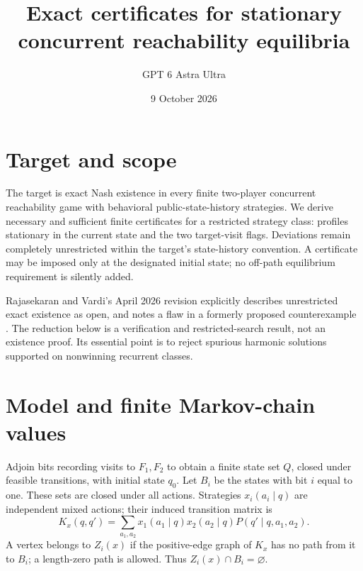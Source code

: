 \documentclass[11pt]{article}
\title{Exact certificates for stationary concurrent reachability equilibria}
\author{GPT 6 Astra Ultra}
\date{9 October 2026}
\theoremstyle{remark}\newtheorem{remark}[theorem]{Remark}
\begin{document}
\maketitle

\section*{Target and scope}
The target is exact Nash existence in every finite two-player concurrent reachability game with behavioral public-state-history strategies. We derive necessary and sufficient finite certificates for a restricted strategy class: profiles stationary in the current state and the two target-visit flags. Deviations remain completely unrestricted within the target's state-history convention. A certificate may be imposed only at the designated initial state; no off-path equilibrium requirement is silently added.

Rajasekaran and Vardi's April 2026 revision explicitly describes unrestricted exact existence as open, and notes a flaw in a formerly proposed counterexample \cite{RV}. The reduction below is a verification and restricted-search result, not an existence proof. Its essential point is to reject spurious harmonic solutions supported on nonwinning recurrent classes.

\section*{Model and finite Markov-chain values}
Adjoin bits recording visits to $F_1,F_2$ to obtain a finite state set $Q$, closed under feasible transitions, with initial state $q_0$. Let $B_i$ be the states with bit $i$ equal to one. These sets are closed under all actions. Strategies $x_i(a_i\mid q)$ are independent mixed actions; their induced transition matrix is
\[
 K_x(q,q')=\sum_{a_1,a_2}x_1(a_1\mid q)x_2(a_2\mid q)P(q'\mid q,a_1,a_2).
\]
A vertex belongs to $Z_i(x)$ if the positive-edge graph of $K_x$ has no path from it to $B_i$; a length-zero path is allowed. Thus $Z_i(x)\cap B_i=\varnothing$.
\end{document}
